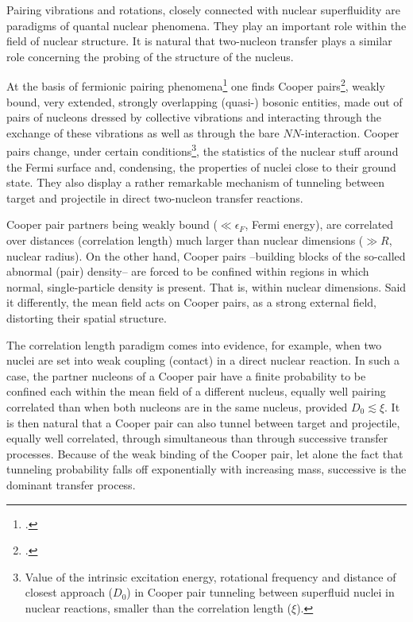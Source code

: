 Pairing vibrations and rotations, closely connected with nuclear superfluidity are  paradigms of quantal nuclear phenomena. They  play an important  role within the field of nuclear structure. It is natural that two-nucleon transfer plays a similar role concerning the probing of the structure of the nucleus.

 
At the basis of fermionic pairing phenomena\footnote{\cite{Bardeen:57a,Bardeen:57b}.} one finds Cooper pairs\footnote{\cite{Cooper:56}.}, weakly bound, very extended, strongly overlapping (quasi-) bosonic entities, made out of pairs of nucleons dressed by collective vibrations and interacting  through the exchange of these vibrations as well as through the bare $NN$-interaction.
Cooper pairs change, under certain conditions\footnote{Value of the intrinsic excitation energy, rotational frequency and distance of closest approach ($D_0$) in Cooper pair tunneling between superfluid nuclei in nuclear reactions, smaller than the correlation length ($\xi$).}, the statistics of the nuclear stuff around the Fermi surface and, condensing, the properties of nuclei close to their ground state. They also display a rather remarkable mechanism of tunneling between  target and projectile in  direct two-nucleon transfer reactions.


Cooper pair partners being weakly bound ($\ll \epsilon_F$, Fermi energy), are correlated over distances (correlation length) much larger than nuclear dimensions ($\gg R$, nuclear radius). On the other hand, Cooper pairs --building blocks of the so-called abnormal (pair) density-- are forced to be confined within regions in which normal, single-particle density is present. That is, within nuclear dimensions. Said it differently, the mean field acts on Cooper pairs, as a strong external field,  distorting their spatial structure.


The correlation length paradigm comes into evidence, for example, when two nuclei are set into weak coupling (contact) in a direct nuclear reaction. In such a  case,  the partner nucleons of a Cooper pair have a finite probability to be confined each within the mean field of a different nucleus, equally well pairing correlated than when both nucleons are in the same nucleus, provided $D_0\lesssim\xi$. It is then natural that a Cooper pair can also tunnel between target and projectile, equally well correlated, through simultaneous than through successive transfer processes. Because of the weak binding of the Cooper pair, let alone the fact that tunneling probability falls off exponentially with increasing mass, successive is the dominant transfer process.
 
